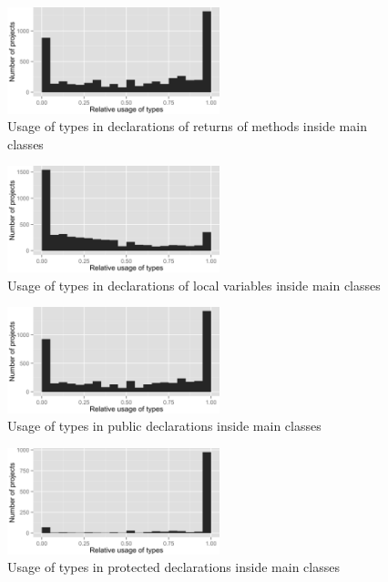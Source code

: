 \begin{figure}[h]
\centering 
\includegraphics[width=0.55\textwidth]{../aosd_2014/analysis/result/test/main/histograms/7_Method_Return.png} 
\caption{Usage of types in declarations of returns of methods inside main classes}
\end{figure}

\begin{figure}[h]
\centering 
\includegraphics[width=0.55\textwidth]{../aosd_2014/analysis/result/test/main/histograms/6_Local_Variable.png} 
\caption{Usage of types in declarations of local variables inside main classes}
\end{figure}

\begin{figure}[h]
\centering 
\includegraphics[width=0.55\textwidth]{../aosd_2014/analysis/result/test/main/histograms/13_Public.png} 
\caption{Usage of types in public declarations inside main classes}
\end{figure}

\begin{figure}[h]
\centering 
\includegraphics[width=0.55\textwidth]{../aosd_2014/analysis/result/test/main/histograms/12_Protected.png} 
\caption{Usage of types in protected declarations inside main classes}
\end{figure}

